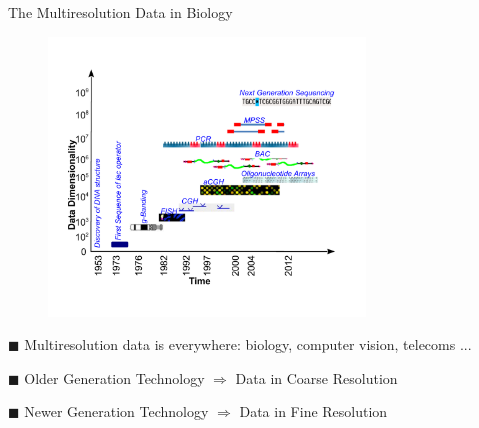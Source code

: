 \documentclass[first=dgreen,second=purple,logo=redexc]{aaltoslides}
\begin{document}

\begin{frame} {The Multiresolution Data in Biology} 

\vspace{1mm}

\begin{figure}
\centering
  \includegraphics[trim=1cm 2cm 0.5cm 2.2cm, clip=true, width=0.75\textwidth]{figures/arraytypes}
\end{figure}

\vspace{-3mm}

\footnotesize
$\blacksquare$ Multiresolution data is everywhere: biology, computer vision, telecoms ...

$\blacksquare$ Older Generation Technology $\Rightarrow$ Data in Coarse Resolution

$\blacksquare$ Newer Generation Technology $\Rightarrow$ Data in Fine Resolution


\end{frame}
\end{document}
